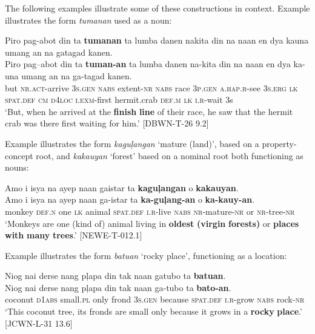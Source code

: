 \largerpage
The following examples illustrate some of these constructions in context. Example  illustrates the form \textit{tumanan} used as a noun:

\ea
\label{bkm:Ref419298360}
Piro  pag-abot  din  ta  \textbf{tumanan}  ta  lumba  danen nakita  din  na  naan  en  dya  kauna umang  an  na  gatagad  kanen. \\\smallskip
 \gll Piro  pag--abot  din  ta  \textbf{tuman-an}  ta  lumba  danen na-kita  din  na  naan  en  dya  ka-una umang  an  na  ga-tagad  kanen.\footnotemark{} \\
but  \textsc{nr.act}-arrive  3\textsc{s.gen}  \textsc{nabs}  extent\textsc{-nr}  \textsc{nabs}  race  3\textsc{p.gen}
\textsc{a.hap.r}-see  3\textsc{s.erg}  \textsc{lk}  \textsc{spat.def}  \textsc{cm}  \textsc{d4loc}  \textsc{i.exm}-first
hermit.crab  \textsc{def.m}  \textsc{lk}  \textsc{i.r-}wait  3s \\
\glt `But, when he arrived at the \textbf{finish} \textbf{line} of their race, he saw that the hermit crab was there first waiting for him.’ [DBWN-T-26 9.2]
\z

Example  illustrates the form \textit{kaguļangan} ‘mature (land)’, based on a prop\-er\-ty-concept root, and \textit{kakauyan} ‘forest’ based on a nominal root both functioning as nouns:

\ea
\label{bkm:Ref106949019}
Amo  i  isya  na  ayep  naan  gaistar  ta  \textbf{kaguļangan} o  \textbf{kakauyan}. \\\smallskip
 \gll Amo  i  isya  na  ayep  naan  ga-istar  ta  \textbf{ka-guļang-an} o  \textbf{ka-kauy-an}. \\
monkey  \textsc{def.n}  one  \textsc{lk}  animal  \textsc{spat.def}  \textsc{i.r}-live  \textsc{nabs}  \textsc{nr}-mature-\textsc{nr} or  \textsc{nr}-tree-\textsc{nr} \\
\glt \textsc{‘}Monkeys are one (kind of) animal living in \textbf{oldest} \textbf{(virgin} \textbf{forests)} or \textbf{places} \textbf{with} \textbf{many} \textbf{trees}.’ [NEWE-T-012.1]
\z

Example  illustrates the form \textit{batuan} ‘rocky place’, functioning as a location:

\ea
\label{bkm:Ref106949274}
Niog  nai  derse  nang  pļapa  din  tak  naan gatubo  ta  \textbf{batuan}. \\\smallskip
 \gll Niog  nai  derse  nang  pļapa  din  tak  naan ga-tubo  ta  \textbf{bato-an}. \\
coconut  \textsc{d}1\textsc{abs}  small.\textsc{pl}  only  frond  3\textsc{s.gen}  because  \textsc{spat.def} \textsc{i.r}-grow  \textsc{nabs}  rock-\textsc{nr} \\
\glt ‘This coconut tree, its fronds are small only because it grows in a \textbf{rocky} \textbf{place}.’ [JCWN-L-31 13.6]
\z

